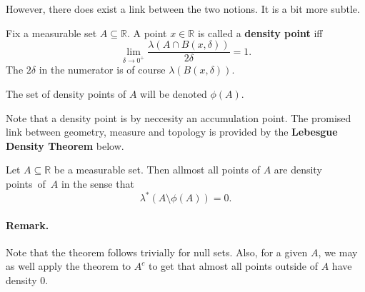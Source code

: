 However, there does exist a link between the two notions. It is a bit more subtle.

\begin{defn}
    Fix a measurable set \( A \subseteq \mathbb{R} \). A point \( x \in \mathbb{R} \) is called a \textbf{density point} iff
    \[ 
        \lim_{\delta \to 0^+} \frac{\lambda(A \cap B(x, \delta))}{2\delta} = 1.
   \]
   The \( 2\delta \) in the numerator is of course \( \lambda(B(x, \delta)) \).
\end{defn}
\begin{defn}
    The set of density points of \( A \) will be denoted \( \phi(A) \).
\end{defn}


Note that a density point is by neccesity an accumulation point. The promised link between geometry, measure and topology is provided by the \textbf{Lebesgue Density Theorem} below.
\begin{thm}\label{LebesgueDensityTheorem}
    Let \( A \subseteq \mathbb{R} \) be a measurable set. Then allmost all points of \( A \) are density points~of~\( A \) in the sense that 
    \ankimark
    \[ 
       \lambda^* (A \setminus \phi(A)) = 0. 
   \]
   
\end{thm}
\paragraph{Remark.} Note that the theorem follows trivially for null sets. Also, for a given \( A \), we may as well apply the theorem to \( A^c \) to get that almost all points outside of \( A \) have density \( 0 \).

